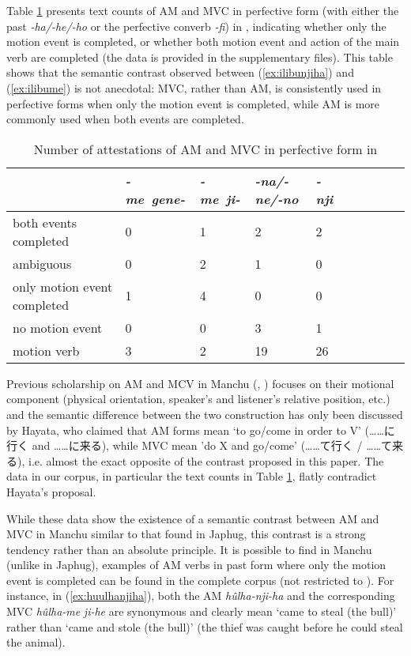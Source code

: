 \documentclass{article}
\newcommand{\ipa}[1]{\textit{{\phon\mbox{#1}}}} %
\newcommand{\zh}[1]{{\cn#1}}
\begin{document}
Table \ref{tab:counts.dzengsheo} presents text counts of AM and MVC in perfective form (with either the past \ipa{-ha/-he/-ho} or the perfective converb \ipa{-fi}) in \citet{cosmo06dzengseo}, indicating whether only the motion event is completed, or whether both motion event and action of the main verb are completed (the data is provided in the supplementary files). This table shows that the semantic contrast observed between (\ref{ex:ilibunjiha}) and (\ref{ex:ilibume}) is not anecdotal: MVC, rather than AM,  is consistently used in perfective forms when only the motion event is completed, while AM is more commonly used when both events are completed.


\begin{table}[h]
\caption{Number of attestations of AM and MVC in perfective form in \citet{cosmo06dzengseo} } \centering \label{tab:counts.dzengsheo}
\begin{tabular}{llllllllll}
\toprule
 & 	\ipa{-me gene-} & 	\ipa{-me ji-} & 	\ipa{-na/-ne/-no} & 	\ipa{-nji} & 	\\
 \midrule
both events completed & 	0 & 	1 & 	2 & 	2 & 	\\
ambiguous & 	0 & 	2 & 	1 & 	0 & 	\\
only motion event completed & 	1 & 	4 & 	0 & 	0 & 	\\
no motion event & 	0 & 	0 & 	3 & 	1 & 	\\
motion verb & 	3 & 	2 & 	19 & 	26 & 	\\
\bottomrule
\end{tabular}
\end{table}


Previous scholarship on AM and MCV in Manchu (\citealt{hayata95yuku}, \citealt{kubo97come}) focuses on their motional component (physical orientation, speaker’s and listener’s relative position, etc.) and the semantic difference between the two construction has only been discussed by Hayata, who claimed that AM forms mean ‘to go/come in order to V’ (\zh{……に行く} and \zh{……に来る}), while MVC mean 'do X and go/come' (\zh{……て行く} / \zh{……て来る}), i.e. almost the exact opposite of the contrast proposed in this paper. The data in our corpus, in particular the text counts in Table \ref{tab:counts.dzengsheo}, flatly contradict Hayata's proposal.

While these data show the existence of a semantic contrast between AM and MVC in Manchu similar to that found in Japhug, this contrast is a strong tendency rather than an absolute principle. It is possible to find in Manchu (unlike in Japhug), examples of AM verbs in past form where only the motion event is completed can be found in the complete corpus (not restricted to \citet{cosmo06dzengseo}). For instance,  in (\ref{ex:huulhanjiha}), both the AM \ipa{hûlha-nji-ha} and the corresponding MVC \ipa{hûlha-me} \ipa{ji-he} are synonymous and clearly mean `came to steal (the bull)' rather than `came and stole (the bull)' (the thief was caught before he could steal the animal).
\end{document}
